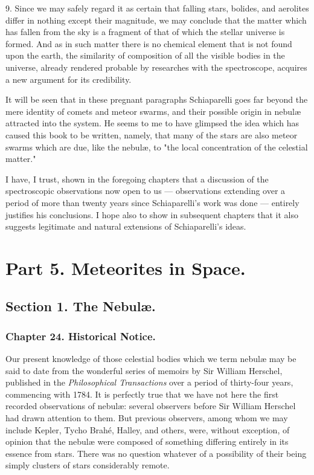\documentclass[a4paper, 12pt, oneside, polutonikogreek, english]{article}
\begin{document}
9. Since we may safely regard it as certain that falling stars, bolides, and aerolites differ in nothing except their magnitude, we may conclude that the matter which has fallen from the sky is a fragment of that of which the stellar universe is formed. And as in such matter there is no chemical element that is not found upon the earth, the similarity of composition of all the visible bodies in the universe, already rendered probable by researches with the spectroscope, acquires a new argument for its credibility.

It will be seen that in these pregnant paragraphs Schiaparelli goes far beyond the mere identity of comets and meteor swarms, and their possible origin in nebulæ attracted into the system. He seems to me to have glimpsed the idea which has caused this book to be written, namely, that many of the stars are also meteor swarms which are due, like the nebulæ, to "the local concentration of the celestial matter."

I have, I trust, shown in the foregoing chapters that a discussion of the spectroscopic observations now open to us --- observations extending over a period of more than twenty years since Schiaparelli's work was done --- entirely justifies his conclusions. I hope also to show in subsequent chapters that it also suggests legitimate and natural extensions of Schiaparelli's ideas.

\section{Part 5. Meteorites in Space.}

\subsection{Section 1. The Nebulæ.}

\subsubsection{Chapter 24. Historical Notice.}

Our present knowledge of those celestial bodies which we term nebulæ may be said to date from the wonderful series of memoirs by Sir William Herschel, published in the \emph{Philosophical Transactions} over a period of thirty-four years, commencing with 1784. It is perfectly true that we have not here the first recorded observations of nebulæ: several observers before Sir William Herschel had drawn attention to them. But previous observers, among whom we may include Kepler, Tycho Brahé, Halley, and others, were, without exception, of opinion that the nebulæ were composed of something differing entirely in its essence from stars. There was no question whatever of a possibility of their being simply clusters of stars considerably remote.
\end{document}
